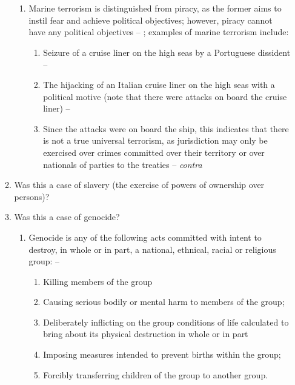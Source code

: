 \begin{enumerate}
\begin{enumerate}
\begin{enumerate}
            \item Marine terrorism is distinguished from piracy, as the former aims to instil fear and achieve political objectives; however, piracy cannot have any political objectives -- ; examples of marine terrorism include:
            \begin{enumerate}
                \item Seizure of a cruise liner on the high seas by a Portuguese dissident -- 
                \item The hijacking of an Italian cruise liner on the high seas with a political motive (note that there were attacks on board the cruise liner) -- 
                \item Since the attacks were on board the ship, this indicates that there is not a true universal terrorism, as jurisdiction may only be exercised over crimes committed over their territory or over nationals of parties to the treaties -- \textit{contra} 
            \end{enumerate}
        \end{enumerate}
        \item Was this a case of slavery (the exercise of powers of ownership over persons)?
        \item Was this a case of genocide?
        \begin{enumerate}
            \item Genocide is any of the following acts committed with intent to destroy, in whole or in part, a national, ethnical, racial or religious group: -- 
            \begin{enumerate}
                \item Killing members of the group
                \item Causing serious bodily or mental harm to members of the group;
                \item Deliberately inflicting on the group conditions of life calculated to bring about its physical destruction in whole or in part
                \item Imposing measures intended to prevent births within the group;
                \item Forcibly transferring children of the group to another group.
            \end{enumerate}

\end{enumerate}
\end{enumerate}
\end{enumerate}
